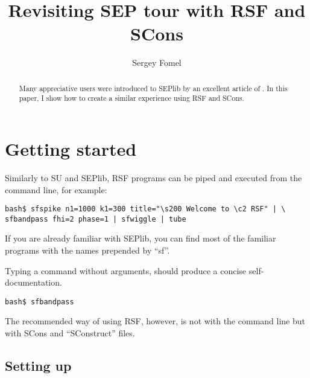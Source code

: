 \title{Revisiting SEP tour with RSF and SCons}


\author{Sergey Fomel}



\maketitle

\begin{abstract}

Many appreciative users were introduced to SEPlib
\cite[]{Claerbout.sep.70.413} by an excellent article of
\cite{Dellinger.sep.73.461}. In this paper, I show how to create a similar
experience using RSF and SCons.

\end{abstract}

\section{Getting started}

Similarly to SU and SEPlib, RSF programs can be piped and executed from the
command line, for example:

\begin{verbatim}
bash$ sfspike n1=1000 k1=300 title="\s200 Welcome to \c2 RSF" | \
sfbandpass fhi=2 phase=1 | sfwiggle | tube
\end{verbatim}

If you are already familiar with SEPlib, you can find most of the familiar
programs with the names prepended by ``sf''.

Typing a command without arguments, should produce a concise
self-documentation. 

\begin{verbatim}
bash$ sfbandpass
\end{verbatim}

The recommended way of using RSF, however, is not with the command line but
with SCons and ``SConstruct'' files.

\subsection{Setting up}


